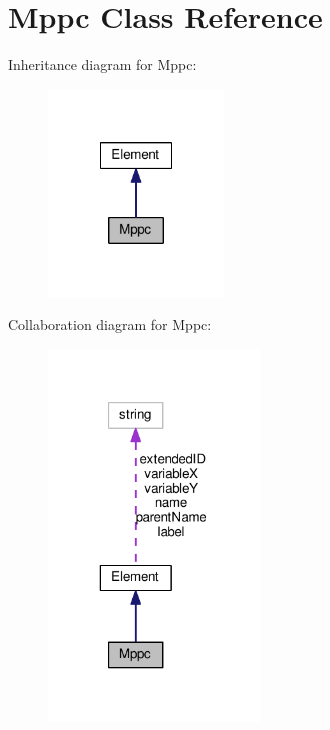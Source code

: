 \hypertarget{classMppc}{\section{Mppc Class Reference}
\label{classMppc}
}


Inheritance diagram for Mppc\+:
\nopagebreak
\begin{figure}[H]
\begin{center}
\leavevmode
\includegraphics[width=132pt]{classMppc__inherit__graph}
\end{center}
\end{figure}


Collaboration diagram for Mppc\+:
\nopagebreak
\begin{figure}[H]
\begin{center}
\leavevmode
\includegraphics[width=160pt]{classMppc__coll__graph}
\end{center}
\end{figure}
